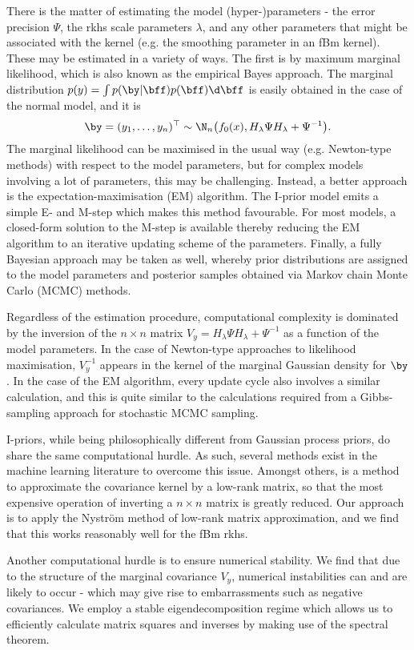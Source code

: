 There is the matter of estimating the model (hyper-)parameters - the error precision $\Psi$, the \gls{rkhs} scale parameters $\lambda$, and any other parameters that might be associated with the kernel (e.g. the smoothing parameter in an fBm kernel). These may be estimated in a variety of ways. The first is by maximum marginal likelihood, which is also known as the empirical Bayes approach. The marginal distribution $p(y) = \int p(\by|\bff)p(\bff) \d \bff$ is easily obtained in the case of the normal model, and it is
\[
  \by = (y_1,\dots,y_n)^\top \sim \N_n\big(f_0(x), H_\lambda\Psi H_\lambda + \Psi^{-1}\big).
\]
The marginal likelihood can be maximised in the usual way (e.g. Newton-type methods) with respect to the model parameters, but for complex models involving a lot of parameters, this may be challenging.
Instead, a better approach is the expectation-maximisation (EM) algorithm. 
The I-prior model emits a simple E- and M-step which makes this method favourable. 
For most models, a closed-form solution to the M-step is available thereby reducing the EM algorithm to an iterative updating scheme of the parameters.
Finally, a fully Bayesian approach may be taken as well, whereby prior distributions are assigned to the model parameters and posterior samples obtained via Markov chain Monte Carlo (MCMC) methods. 


Regardless of the estimation procedure, computational complexity is dominated by the inversion of the $n \times n$ matrix $V_y = H_\lambda\Psi H_\lambda + \Psi^{-1}$ as a function of the model parameters. 
In the case of Newton-type approaches to likelihood maximisation, $V_y^{-1}$ appears in the kernel of the marginal Gaussian density for $\by$.
In the case of the EM algorithm, every update cycle also involves a similar calculation, and this is quite similar to the calculations required from a Gibbs-sampling approach for stochastic MCMC sampling. 


I-priors, while being philosophically different from Gaussian process priors, do share the same computational hurdle. 
As such, several methods exist in the machine learning literature to overcome this issue. 
Amongst others, is a method to approximate the covariance kernel by a low-rank matrix, so that the most expensive operation of inverting a $n \times n$ matrix is greatly reduced. 
Our approach is to apply the Nystr\"om method of low-rank matrix approximation, and we find that this works reasonably well for the fBm \gls{rkhs}. 


Another computational hurdle is to ensure numerical stability. We find that due to the structure of the marginal covariance $V_y$, numerical instabilities can and are likely to occur - which may give rise to embarrassments such as negative covariances. 
We employ a stable eigendecomposition regime which allows us to efficiently calculate matrix squares and inverses by making use of the spectral theorem.


